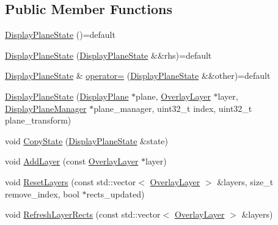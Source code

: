 \subsection*{Public Member Functions}
\begin{DoxyCompactItemize}
\item 
\mbox{\hyperlink{classhwcomposer_1_1DisplayPlaneState_a40f04a556f4e9871aa7cdf1ca5f6372a}{Display\+Plane\+State}} ()=default
\item 
\mbox{\hyperlink{classhwcomposer_1_1DisplayPlaneState_a6db912c3342b64ccdf674ad77b8c7db1}{Display\+Plane\+State}} (\mbox{\hyperlink{classhwcomposer_1_1DisplayPlaneState}{Display\+Plane\+State}} \&\&rhs)=default
\item 
\mbox{\hyperlink{classhwcomposer_1_1DisplayPlaneState}{Display\+Plane\+State}} \& \mbox{\hyperlink{classhwcomposer_1_1DisplayPlaneState_a8b6171b63e92d58b6f61742b7d816fd3}{operator=}} (\mbox{\hyperlink{classhwcomposer_1_1DisplayPlaneState}{Display\+Plane\+State}} \&\&other)=default
\item 
\mbox{\hyperlink{classhwcomposer_1_1DisplayPlaneState_a84ba73405579800349219c7105e3dce4}{Display\+Plane\+State}} (\mbox{\hyperlink{classhwcomposer_1_1DisplayPlane}{Display\+Plane}} $\ast$plane, \mbox{\hyperlink{structhwcomposer_1_1OverlayLayer}{Overlay\+Layer}} $\ast$layer, \mbox{\hyperlink{classhwcomposer_1_1DisplayPlaneManager}{Display\+Plane\+Manager}} $\ast$plane\+\_\+manager, uint32\+\_\+t index, uint32\+\_\+t plane\+\_\+transform)
\item 
void \mbox{\hyperlink{classhwcomposer_1_1DisplayPlaneState_a9d078f6263568fea78ba7915e4a6a385}{Copy\+State}} (\mbox{\hyperlink{classhwcomposer_1_1DisplayPlaneState}{Display\+Plane\+State}} \&state)
\item 
void \mbox{\hyperlink{classhwcomposer_1_1DisplayPlaneState_aa983a44ace5cc424fa95d1c6b4cfebfc}{Add\+Layer}} (const \mbox{\hyperlink{structhwcomposer_1_1OverlayLayer}{Overlay\+Layer}} $\ast$layer)
\item 
void \mbox{\hyperlink{classhwcomposer_1_1DisplayPlaneState_a639a5b33751b90cc4a76a94d6d5032e2}{Reset\+Layers}} (const std\+::vector$<$ \mbox{\hyperlink{structhwcomposer_1_1OverlayLayer}{Overlay\+Layer}} $>$ \&layers, size\+\_\+t remove\+\_\+index, bool $\ast$rects\+\_\+updated)
\item 
void \mbox{\hyperlink{classhwcomposer_1_1DisplayPlaneState_acdbd9b16d22e9100bfa6b5700998ba44}{Refresh\+Layer\+Rects}} (const std\+::vector$<$ \mbox{\hyperlink{structhwcomposer_1_1OverlayLayer}{Overlay\+Layer}} $>$ \&layers)
\item 

\end{DoxyCompactItemize}
